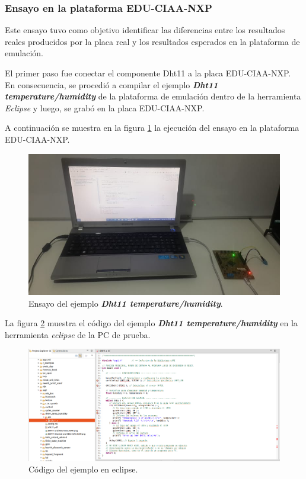 \subsubsection{Ensayo en la plataforma EDU-CIAA-NXP} 

Este ensayo tuvo como objetivo identificar
las diferencias entre los resultados reales producidos por la placa real y los resultados esperados en la plataforma de emulación.

El primer paso fue conectar el componente Dht11 a la placa EDU-CIAA-NXP. En consecuencia, se procedió a compilar el ejemplo \textit{\textbf{Dht11 temperature/humidity}} de la plataforma de emulación dentro de la herramienta 
\textit{Eclipse} y luego, se grabó en la placa EDU-CIAA-NXP.

A continuación se muestra en la figura \ref{fig:TestHardware} la ejecución del ensayo en la plataforma EDU-CIAA-NXP.

\begin{figure}[ht]
	\centering
	\includegraphics[scale=.49]{./Figures/TestHardware.jpeg}
	\caption{Ensayo del ejemplo \textit{\textbf{Dht11 temperature/humidity}}.}
	\label{fig:TestHardware}
\end{figure}



La figura \ref{fig:TestEclipse} muestra el código del ejemplo \textit{\textbf{Dht11 temperature/humidity}} en la herramienta \textit{eclipse} de la PC de prueba.

\begin{figure}[ht]
	\centering
	\includegraphics[scale=.22]{./Figures/TestEclipse.png}
	\caption{Código del ejemplo en eclipse.}
	\label{fig:TestEclipse}
\end{figure}


